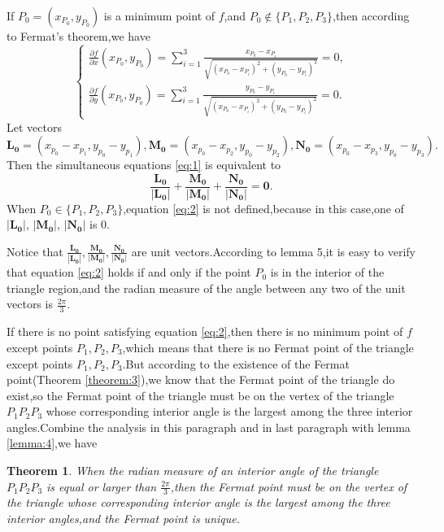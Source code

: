 \documentclass{amsart}
\theoremstyle{plain}
\newtheorem{theorem}{Theorem}
\theoremstyle{definition}
\begin{document}
If $P_0=(x_{P_{0}},y_{P_{0}})$ is a minimum point of $f$,and $P_0\not\in \{P_1,P_2,P_3\}$,then
according to Fermat's theorem,we have
\begin{equation}\label{eq:1}
  \begin{cases}
          \displaystyle\frac{\partial f}{\partial x}(x_{P_{0}},y_{P_{0}})=\sum_{i=1}^3
  \frac{x_{P_{0}}-x_{P_{i}}}{\sqrt{(x_{P_{0}}-x_{P_{i}})^2+(y_{P_{0}}-y_{P_{i}})^2}}=0,\\
\displaystyle\frac{\partial f}{\partial
    y}(x_{P_{0}},y_{P_{0}})=\sum_{i=1}^3 \frac{y_{P_{0}}-y_{P_{i}}}{\sqrt{(x_{P_{0}}-x_{P_{i}})^2+(y_{P_{0}}-y_{P_{i}})^2}}=0.
  \end{cases}
\end{equation}
Let vectors
$$
\mathbf{L_{0}}=(x_{p_{0}}-x_{p_{1}},y_{p_{0}}-y_{p_{1}}),\mathbf{M_{0}}=(x_{p_{0}}-x_{p_{2}},y_{p_{0}}-y_{p_{2}}),\mathbf{N_{0}}=(x_{p_{0}}-x_{p_{3}},y_{p_{0}}-y_{p_{3}}).
$$
Then the simultaneous equations \eqref{eq:1} is equivalent to
\begin{equation}
  \label{eq:2}
\mathbf{\frac{L_{0}}{|L_{0}|}+\frac{M_{0}}{|M_{0}|}+\frac{N_{0}}{|N_{0}|}}=\mathbf{0}.
\end{equation}
When $P_0\in \{P_1,P_2,P_3\}$,equation \eqref{eq:2} is not
defined,because in this case,one of  $|\mathbf{L_{0}}|$,
$|\mathbf{M_{0}}|$,  $|\mathbf{N_0}|$ is $0$.

Notice that 
$\frac{\mathbf{L_0}}{|\mathbf{L_0}|},\frac{\mathbf{M_0}}{|\mathbf{M_0}|},\frac{\mathbf{N_0}}{|\mathbf{N_0}|}$
are unit vectors.According to lemma 5,it is easy to verify that equation
\eqref{eq:2} holds if and only if the point $P_0$ is in the interior of the
triangle region,and the radian measure of the angle between any
two of the unit vectors is $\frac{2\pi}{3}$.

If there is no point satisfying equation \eqref{eq:2},then there is no minimum point of $f$ except points
$P_1,P_2,P_{3}$,which means that there is no Fermat point of the triangle except
points $P_1,P_2,P_3$.But according to the existence of the Fermat
point(Theorem \eqref{theorem:3}),we
know that the Fermat point of the triangle do exist,so the Fermat point of the triangle must be on the vertex of the triangle
$P_1P_2P_3$ whose corresponding interior angle is the
largest among the three interior angles.Combine the analysis in this
paragraph and in last paragraph with  lemma
\eqref{lemma:4},we have


\begin{theorem}\label{theorem:9}
When the radian measure of an interior angle of the triangle $P_1P_2P_3$
is equal or larger than $\frac{2\pi}{3}$,then the Fermat point must be on the vertex of
the triangle whose corresponding interior angle is the largest among
the three interior angles,and the Fermat point is unique.
\end{theorem}
\end{document}
